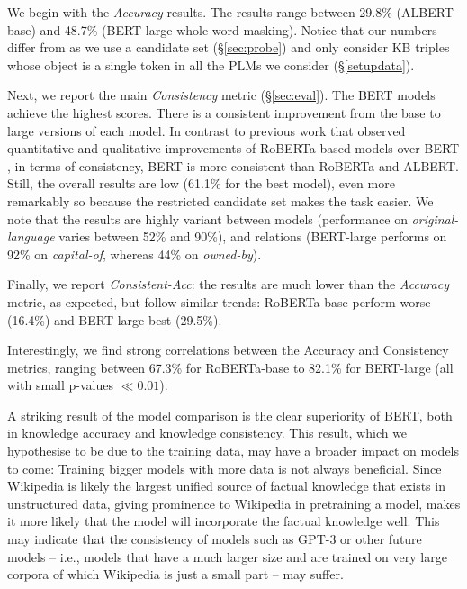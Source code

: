 We begin with the \textit{Accuracy} results. 
The results range between 29.8\% (ALBERT-base) and 48.7\% (BERT-large whole-word-masking).
Notice that our numbers differ from \citet{lama} as we use a
candidate set (\S\ref{sec:probe}) and only consider KB
triples whose object is a single token in all the PLMs we consider (\S\ref{setupdata}). 

Next, we report the main \textit{Consistency} metric (\S\ref{sec:eval}).
The BERT models achieve the highest scores. There is a consistent improvement from the {base} to {large} versions of each model.
In contrast to previous work that observed quantitative and qualitative improvements of RoBERTa-based models over BERT \cite{roberta,talmor2019olmpics}, in terms of consistency, BERT is more consistent than RoBERTa and ALBERT.
Still, the overall results are low (61.1\% for
the best model), %
even more remarkably so because the restricted candidate set
makes the task easier.
We note that the results are highly variant between models
 (performance on \textit{original-language} varies between 52\% and 90\%), and relations (BERT-large performs on 92\% on \textit{capital-of}, whereas 44\% on \textit{owned-by}).

Finally, we report
\emph{Consistent-Acc}:
the results are much lower than the \textit{Accuracy} metric, as expected,
but follow similar trends: RoBERTa-base perform worse (16.4\%) and BERT-large  best  (29.5\%).

Interestingly, we find strong correlations between the Accuracy and Consistency metrics, ranging between 67.3\% for RoBERTa-base to 82.1\% for BERT-large (all with small p-values $\ll0.01 $).




A striking result of the model comparison is
the clear superiority of
BERT, both in knowledge accuracy and knowledge
consistency. This result, which we hypothesise to be due to
the training data, may have a broader impact on models to
come: Training bigger models with more data is not always
beneficial. Since Wikipedia is likely the largest unified source
of factual knowledge that exists in unstructured data,
giving prominence to Wikipedia in pretraining a model, makes it more
likely that the model will incorporate the factual knowledge
well.
This may indicate that the consistency of models such as GPT-3 \cite{gpt3}
or other future models -- i.e., models that
have a much larger size and
are trained on very large corpora of
which Wikipedia is just a small part -- may suffer.

